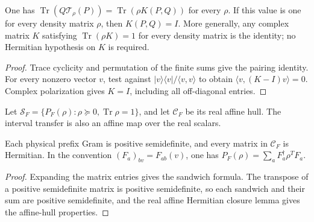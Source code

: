\begin{lemma}
    \label{thm:mpu_density_gram_separation}
    \leanok
    One has $\operatorname{Tr}(Q\mathcal T_\rho(P))
        =\operatorname{Tr}(\rho K(P,Q))$ for every $\rho$.
    If this value is one for every density matrix $\rho$, then
    $K(P,Q)=I$. More generally, any complex matrix $K$ satisfying
    $\operatorname{Tr}(\rho K)=1$ for every density matrix is the
    identity; no Hermitian hypothesis on $K$ is required.
\end{lemma}
\begin{proof}\leanok
    Trace cyclicity and permutation of the finite sums give the
    pairing identity. For every nonzero vector $v$, test against
    $|v\rangle\langle v|/\langle v,v\rangle$ to obtain
    $\langle v,(K-I)v\rangle=0$. Complex polarization gives $K=I$,
    including all off-diagonal entries.
\end{proof}

\begin{definition}
    \label{def:mpu_prefix_gram_affine_hull}
    \leanok
    Let $\mathcal S_F=\{P_F(\rho):\rho\succeq0,
        \operatorname{Tr}\rho=1\}$, and let $\mathcal C_F$ be its
    real affine hull. The interval transfer is also an affine map
    over the real scalars.
\end{definition}

\begin{lemma}
    \label{thm:mpu_prefix_gram_positivity}
    \leanok
    Each physical prefix Gram is positive semidefinite, and every
    matrix in $\mathcal C_F$ is Hermitian. In the convention
    $(F_a)_{bv}=F_{ab}(v)$, one has
    $P_F(\rho)=\sum_aF_a^\dagger\rho^T F_a$.
\end{lemma}
\begin{proof}\leanok
    Expanding the matrix entries gives the sandwich formula.
    The transpose of a positive semidefinite matrix is positive
    semidefinite, so each sandwich and their sum are positive
    semidefinite, and the real affine Hermitian closure lemma gives the affine-hull properties.
\end{proof}

